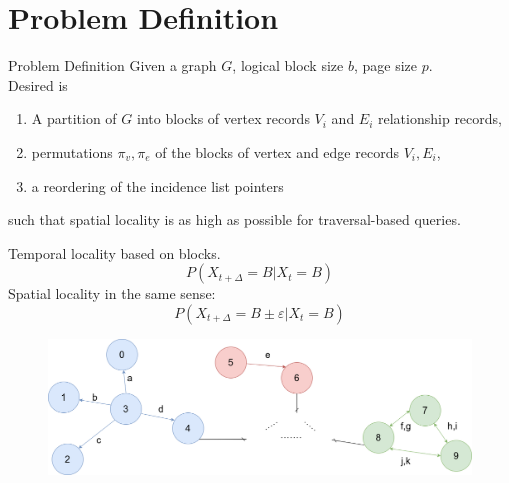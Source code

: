 \documentclass[rgb]{beamer}
\begin{document}
    \section{Problem Definition}
        \begin{frame}[allowframebreaks]{Problem Definition}
            Given a graph $G$, logical block size $b$, page size $p$. \\ [2em]
            Desired is \\ [1em]
            \begin{enumerate}
            \item A partition of $G$ into blocks of vertex records $V_i$ and $E_i$ relationship records, \\ [1em]
            \item permutations $\pi_v, \pi_e$ of the blocks of vertex and edge records $V_i, E_i$,\\ [1em]
            \item a reordering of the incidence list pointers \\ [1.5em]
            \end{enumerate}
            such that spatial locality is as high as possible for traversal-based queries.
            
            \framebreak
            
             Temporal locality based on blocks.
                \[ P (X_{t + \Delta} = B | X_t = B) \]
            Spatial locality in the same sense:
                \[ P(X_{t + \Delta} = B \pm \varepsilon | X_t = B) \]
          
            \framebreak
            \begin{figure}[htp]
                \begin{center}
                    \includegraphics[keepaspectratio,height=0.4\textheight,width=\textwidth]{img/example_graph.png}
                \end{center}
            \end{figure}
            

\end{frame}
\end{document}
